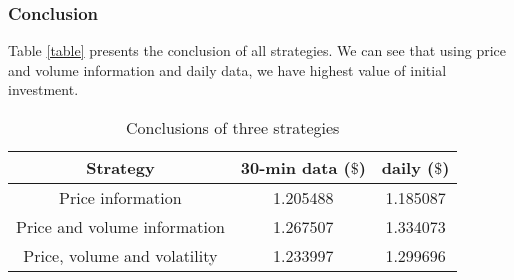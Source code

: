 \documentclass[11pt]{article}
\begin{document}
\subsubsection{Conclusion}
Table \ref{table} presents the conclusion of all strategies. We can see that using price and volume information and daily data, we have highest value of initial investment.
\begin{table}[htpb]
\centering
\begin{tabular}{ccc}
\hline
Strategy&30-min data ($\$$)&daily ($\$$)\\
\hline
Price information&1.205488&1.185087\\
Price and volume information&1.267507&1.334073\\
Price, volume and volatility&1.233997&1.299696\\
\hline
\end{tabular}
\caption{Conclusions of three strategies}
\end{table}\label{table}
\end{document}
